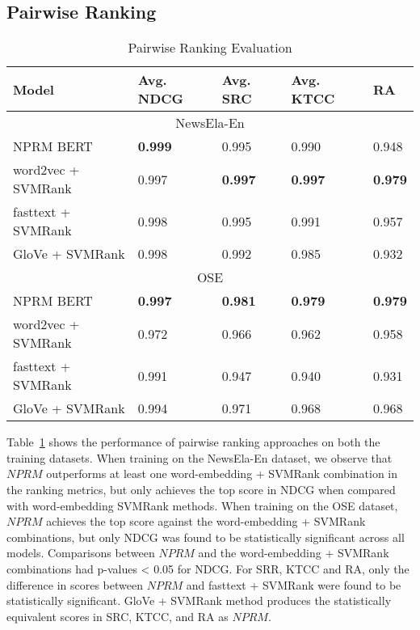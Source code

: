 \documentclass[11pt]{article}
\begin{document}
\subsection{Pairwise Ranking}

\begin{table}[htb]
\begin{tabular}{ |p{2.45cm}|p{0.85cm}|p{0.7cm}|p{0.8cm}| p{0.7cm}|}
 \hline
Model & Avg. NDCG & Avg. SRC & Avg. KTCC & RA\\
 \hline
\multicolumn{5}{|c|}{NewsEla-En} \\
\hline
NPRM BERT   & \textbf{0.999}    & 0.995 & 0.990 & 0.948\\
  \hline
word2vec + SVMRank & 0.997 & \textbf{0.997} & \textbf{0.997} & \textbf{0.979}\\
 \hline
fasttext + SVMRank & 0.998 & 0.995 & 0.991 & 0.957 \\
 \hline
GloVe + SVMRank  & 0.998 & 0.992 & 0.985 & 0.932 \\
 \hline 
 \multicolumn{5}{|c|}{OSE}\\
 \hline
NPRM BERT&  \textbf{0.997}  & \textbf{0.981} & \textbf{0.979} & \textbf{0.979}\\
 \hline
word2vec + SVMRank & 0.972 & 0.966 & 0.962 &0.958 \\
 \hline
fasttext + SVMRank & 0.991 & 0.947 & 0.940 & 0.931\\
 \hline
GloVe + SVMRank & 0.994 & 0.971 & 0.968 & 0.968\\
 \hline
\end{tabular}
\caption{Pairwise Ranking Evaluation}
\label{tab:rankingsingle}
\vspace{-4mm}
\end{table}
Table~\ref{tab:rankingsingle} shows the performance of pairwise ranking approaches on both the training datasets. When training on the NewsEla-En dataset, we observe that $NPRM$ outperforms at least one word-embedding + SVMRank combination in the ranking metrics, but only achieves the top score in NDCG when compared with word-embedding SVMRank methods. When training on the OSE dataset, $NPRM$ achieves the top score against the word-embedding + SVMRank combinations, but only NDCG was found to be statistically significant across all models.  Comparisons between $NPRM$ and the word-embedding + SVMRank combinations had p-values < 0.05 for NDCG.  For SRR, KTCC and RA, only the difference in scores between $NPRM$ and fasttext + SVMRank were found to be statistically significant. GloVe + SVMRank method produces the statistically equivalent scores in SRC, KTCC, and RA as $NPRM$. 
\end{document}
